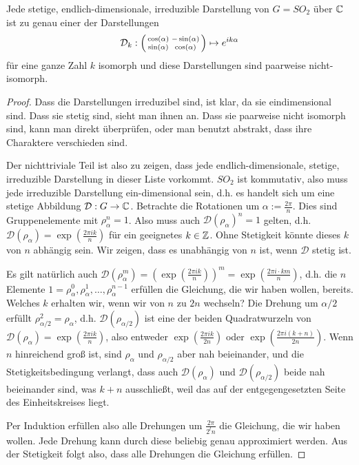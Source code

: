 \begin{theorem}[Darstellungstheorie von $SO_2$ über $\IK=\IC$]
Jede stetige, endlich-dimensionale, irreduzible Darstellung von $G=SO_2$ über $\mathbb{C}$ ist zu genau einer der Darstellungen
\[\mathcal{D}_k : \begin{psmallmatrix}\cos(\alpha)&-\sin(\alpha)\\\sin(\alpha)&\cos(\alpha)\end{psmallmatrix} \mapsto e^{ik\alpha}\]
für eine ganze Zahl $k$ isomorph und diese Darstellungen sind paarweise nicht-isomorph.
\end{theorem}
\begin{proof}
Dass die Darstellungen irreduzibel sind, ist klar, da sie eindimensional sind. Dass sie stetig sind, sieht man ihnen an. Dass sie paarweise nicht isomorph sind, kann man direkt überprüfen, oder man benutzt abstrakt, dass ihre Charaktere verschieden sind.

Der nichttriviale Teil ist also zu zeigen, dass jede endlich-dimensionale, stetige, irreduzible Darstellung in dieser Liste vorkommt. $SO_2$ ist kommutativ, also muss jede irreduzible Darstellung ein-dimensional sein, d.h. es handelt sich um eine stetige Abbildung $\mathcal{D}: G\to\mathbb{C}$. Betrachte die Rotationen um $\alpha:=\frac{2\pi}{n}$. Dies sind Gruppenelemente mit $\rho_\alpha^n=1$. Also muss auch $\mathcal{D}(\rho_\alpha)^n=1$ gelten, d.h. $\mathcal{D}(\rho_\alpha) = \exp(\frac{2\pi i k}{n})$ für ein geeignetes $k\in\mathbb{Z}$. Ohne Stetigkeit könnte dieses $k$ von $n$ abhängig sein. Wir zeigen, dass es unabhängig von $n$ ist, wenn $\mathcal{D}$ stetig ist.

Es gilt natürlich auch $\mathcal{D}(\rho_\alpha^m) = (\exp(\frac{2\pi i k}{n}))^m = \exp(\frac{2\pi i\cdot  km}{n})$, d.h. die $n$ Elemente $1=\rho_\alpha^0, \rho_\alpha^1, \ldots, \rho_\alpha^{n-1}$ erfüllen die Gleichung, die wir haben wollen, bereits. Welches $k$ erhalten wir, wenn wir von $n$ zu $2n$ wechseln? Die Drehung um $\alpha/2$ erfüllt $\rho_{\alpha/2}^2=\rho_\alpha$, d.h. $\mathcal{D}(\rho_{\alpha/2})$ ist eine der beiden Quadratwurzeln von $\mathcal{D}(\rho_\alpha)=\exp(\frac{2\pi i k}{n})$, also entweder $\exp(\frac{2\pi i k}{2n})$ oder $\exp(\frac{2\pi i(k+n)}{2n})$. Wenn $n$ hinreichend groß ist, sind $\rho_\alpha$ und $\rho_{\alpha/2}$ aber nah beieinander, und die Stetigkeitsbedingung verlangt, dass auch $\mathcal{D}(\rho_\alpha)$ und $\mathcal{D}(\rho_{\alpha/2})$ beide nah beieinander sind, was $k+n$ ausschließt, weil das auf der entgegengesetzten Seite des Einheitskreises liegt.

Per Induktion erfüllen also alle Drehungen um $\frac{2\pi}{2^l n}$ die Gleichung, die wir haben wollen. Jede Drehung kann durch diese beliebig genau approximiert werden. Aus der Stetigkeit folgt also, dass alle Drehungen die Gleichung erfüllen.
\end{proof}

